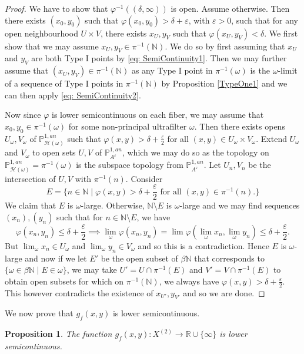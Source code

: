 \documentclass[10pt]{amsart}
\newcommand{\bb}{\mathbb}
\newcommand{\vphi}{\varphi}
\newcommand{\berkP}{\mathbb{P}^{1,an}}
\newcommand{\cal}{\mathcal}
\newcommand{\eps}{\varepsilon}
\numberwithin{theorem}{section}
\newtheorem{proposition}[theorem]{Proposition}
\numberwithin{example}{section}
\numberwithin{definition}{section}
\begin{document}
\begin{proof}
We have to show that $\vphi^{-1}((\delta, \infty))$ is open. Assume otherwise. Then there exists $(x_0,y_0)$ such that $\vphi(x_0,y_0) >\delta + \eps$, with $\eps > 0$, such that for any open neighbourhood $U \times V$, there exists $x_U,y_V$ such that $\vphi(x_U,y_V) < \delta$. We first show that we may assume $x_U,y_V \in \pi^{-1}(\bb{N})$. We do so by first assuming that $x_U$ and $y_V$ are both Type I points by \eqref{eq: SemiContinuity1}. Then we may further assume that $(x_U,y_V) \in \pi^{-1}(\bb{N})$ as any Type I point in $\pi^{-1}(\omega)$ is the $\omega$-limit of a sequence of Type I points in $\pi^{-1}(\bb{N})$ by Proposition \ref{TypeOne1} and we can then apply \eqref{eq: SemiContinuity2}.
\par 
Now since $\vphi$ is lower semicontinuous on each fiber, we may assume that $x_0,y_0 \in \pi^{-1}(\omega)$ for some non-principal ultrafilter $\omega$. Then there exists opens $U_{\omega},V_{\omega}$ of $\berkP_{\cal{H}(\omega)}$ such that $\vphi(x,y) > \delta+ \frac{\eps}{2}$ for all $(x,y) \in U_{\omega}\times V_{\omega}$. Extend $U_{\omega}$ and $V_{\omega}$ to open sets $U,V$ of $\berkP_{A^{\eps}}$, which we may do so as the topology on $\berkP_{\cal{H}(\omega)} = \pi^{-1}(\omega)$ is the subspace topology from $\berkP_{A^{\eps}}$. Let $U_n,V_n$ be the intersection of $U,V$ with $\pi^{-1}(n)$. Consider 
$$E = \{ n \in \bb{N} \mid \vphi(x,y) > \delta + \frac{\eps}{2} \text{ for all } (x,y) \in \pi^{-1}(n).\}$$
We claim that $E$ is $\omega$-large. Otherwise, $\bb{N} \setminus E$ is $\omega$-large and we may find sequences $(x_n),(y_n)$ such that for $n \in \bb{N} \setminus E$, we have 
$$\vphi(x_n,y_n) \leq \delta + \frac{\eps}{2} \implies \lim_{\omega} \vphi(x_n,y_n) = \lim \vphi( \lim_{\omega} x_n, \lim_{\omega} y_n)\leq \delta + \frac{\eps}{2}.$$
But $\lim_{\omega} x_n \in U_{\omega}$ and $\lim_{\omega} y_n \in V_{\omega}$ and so this is a contradiction. Hence $E$ is $\omega$-large and now if we let $E'$ be the open subset of $\beta \bb{N}$ that corresponds to $\{\omega \in \beta \bb{N} \mid E \in \omega\}$, we may take $U' = U \cap \pi^{-1}(E)$ and $V' = V \cap \pi^{-1}(E)$ to obtain open subsets for which on $\pi^{-1}(\bb{N})$, we always have $\vphi(x,y) > \delta + \frac{\eps}{2}$. This however contradicts the existence of $x_{U'}, y_{V'}$ and so we are done. 
\end{proof}

We now prove that $g_f(x,y)$ is lower semicontinuous. 

\begin{proposition} \label{ArakelovGreenContinuity1}
The function $g_f(x,y): X^{(2)} \to \bb{R} \cup \{\infty\}$ is lower semicontinuous.
\end{proposition}
\end{document}
